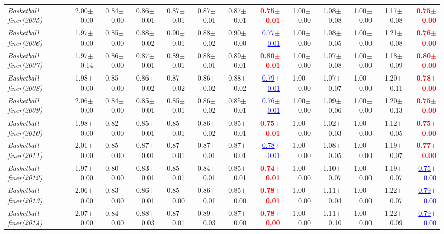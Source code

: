 \documentclass[nohyperref]{article}
\theoremstyle{plain}
\theoremstyle{definition}
\theoremstyle{remark}
\newcommand{\red}[1]{\textcolor{red}{\textbf{#1}}}
\newcommand{\blue}[1]{\textcolor{blue}{\underline{#1}}}
\begin{document}
\begin{table*}[!ht]
{\begin{tabular}{lrr|rrrrr|rrrrr}
			{\it Basketball finer(2005)} & 2.00$\pm$0.00 & 0.84$\pm$0.00 & 0.86$\pm$0.01 & 0.87$\pm$0.01 & 0.87$\pm$0.01 & 0.87$\pm$0.01 & \red{0.75$\pm$0.01} & 1.00$\pm$0.00 & 1.08$\pm$0.08 & 1.00$\pm$0.00 & 1.17$\pm$0.08 & \red{0.75$\pm$0.00} \\
			{\it Basketball finer(2006)} & 1.97$\pm$0.00 & 0.85$\pm$0.00 & 0.88$\pm$0.02 & 0.90$\pm$0.01 & 0.88$\pm$0.02 & 0.90$\pm$0.00 & \blue{0.77$\pm$0.01} & 1.00$\pm$0.00 & 1.08$\pm$0.05 & 1.00$\pm$0.00 & 1.21$\pm$0.08 & \red{0.76$\pm$0.00} \\
			{\it Basketball finer(2007)} & 1.97$\pm$0.14 & 0.86$\pm$0.00 & 0.87$\pm$0.01 & 0.89$\pm$0.01 & 0.88$\pm$0.01 & 0.89$\pm$0.01 & \red{0.80$\pm$0.01} & 1.00$\pm$0.00 & 1.07$\pm$0.08 & 1.00$\pm$0.00 & 1.18$\pm$0.09 & \red{0.80$\pm$0.00} \\
			{\it Basketball finer(2008)} & 1.98$\pm$0.00 & 0.85$\pm$0.00 & 0.86$\pm$0.02 & 0.87$\pm$0.02 & 0.86$\pm$0.02 & 0.88$\pm$0.02 & \blue{0.79$\pm$0.01} & 1.00$\pm$0.00 & 1.07$\pm$0.07 & 1.00$\pm$0.00 & 1.20$\pm$0.11 & \red{0.78$\pm$0.00} \\
			{\it Basketball finer(2009)} & 2.06$\pm$0.00 & 0.84$\pm$0.00 & 0.85$\pm$0.01 & 0.85$\pm$0.01 & 0.86$\pm$0.02 & 0.85$\pm$0.01 & \blue{0.76$\pm$0.01} & 1.00$\pm$0.00 & 1.09$\pm$0.06 & 1.00$\pm$0.00 & 1.20$\pm$0.13 & \red{0.75$\pm$0.00} \\
			{\it Basketball finer(2010)} & 1.98$\pm$0.00 & 0.82$\pm$0.00 & 0.85$\pm$0.01 & 0.85$\pm$0.01 & 0.86$\pm$0.02 & 0.85$\pm$0.01 & \red{0.75$\pm$0.01} & 1.00$\pm$0.00 & 1.02$\pm$0.03 & 1.00$\pm$0.00 & 1.12$\pm$0.05 & \red{0.75$\pm$0.00} \\
			{\it Basketball finer(2011)} & 2.01$\pm$0.00 & 0.85$\pm$0.00 & 0.87$\pm$0.01 & 0.87$\pm$0.01 & 0.87$\pm$0.01 & 0.87$\pm$0.01 & \blue{0.78$\pm$0.01} & 1.00$\pm$0.00 & 1.08$\pm$0.05 & 1.00$\pm$0.00 & 1.19$\pm$0.07 & \red{0.77$\pm$0.00} \\
			{\it Basketball finer(2012)} & 1.97$\pm$0.00 & 0.80$\pm$0.00 & 0.83$\pm$0.01 & 0.85$\pm$0.01 & 0.84$\pm$0.01 & 0.85$\pm$0.01 & \red{0.74$\pm$0.01} & 1.00$\pm$0.00 & 1.10$\pm$0.07 & 1.00$\pm$0.00 & 1.19$\pm$0.07 & \blue{0.75$\pm$0.00} \\
			{\it Basketball finer(2013)} & 2.06$\pm$0.00 & 0.83$\pm$0.00 & 0.86$\pm$0.01 & 0.85$\pm$0.00 & 0.86$\pm$0.01 & 0.85$\pm$0.00 & \red{0.78$\pm$0.01} & 1.00$\pm$0.00 & 1.11$\pm$0.04 & 1.00$\pm$0.00 & 1.22$\pm$0.07 & \blue{0.79$\pm$0.00} \\
			{\it Basketball finer(2014)} & 2.07$\pm$0.00 & 0.84$\pm$0.00 & 0.88$\pm$0.03 & 0.87$\pm$0.01 & 0.89$\pm$0.03 & 0.87$\pm$0.00 & \red{0.78$\pm$0.00} & 1.00$\pm$0.00 & 1.11$\pm$0.10 & 1.00$\pm$0.00 & 1.22$\pm$0.09 & \blue{0.79$\pm$0.00} \\

\end{tabular}}
\end{table*}
\end{document}
